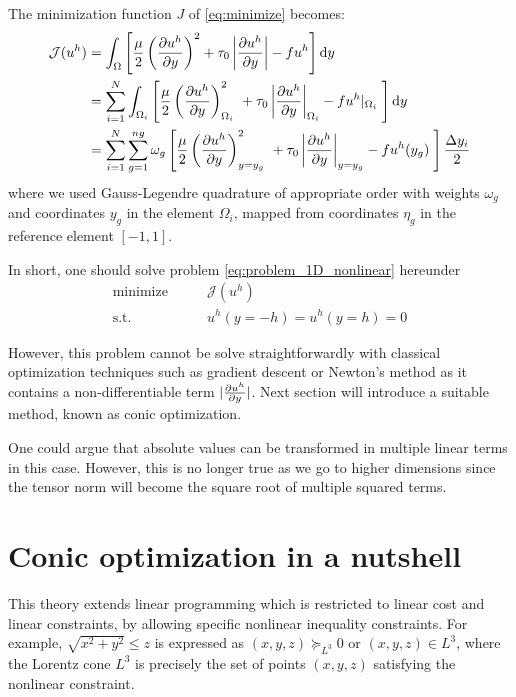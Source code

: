 \documentclass[11 pt]{report}
\begin{document}
The minimization function $J$ of \autoref{eq:minimize} becomes:
\begin{equation}
\begin{aligned}
    \mathcal{J}(u^h) &= \int_{\Omega} \left[ \frac{\mu}{2} \left(\pdv{u^h}{y}\right)^2 + \tau_0 \left|\pdv{u^h}{y}\right| - f u^h \right] \dd y\\
    &= \sum_{i=1}^N \int_{\Omega_i} \left[\frac{\mu}{2}  \left(\pdv{u^h}{y}\right)^2_{\Omega_i} \ + \tau_0 \left|\pdv{u^h}{y}\right|_{\Omega_i} - f u^h\vert_{\Omega_i} \; \right] \dd y\\
    &= \sum_{i=1}^N \sum_{g=1}^{ng} \omega_{g} \left[\frac{\mu}{2}  \left(\pdv{u^h}{y}\right)^2_{y=y_g} \ + \tau_0 \left|\pdv{u^h}{y}\right|_{y=y_g} - f u^h(y_g) \; \right] \frac{\Delta y_i}{2}
\end{aligned}
\end{equation}
where we used Gauss-Legendre quadrature of appropriate order with weights $\omega_g$ and coordinates $y_g$ in the element $\Omega_i$, mapped from coordinates $\eta_g$ in the reference element $[-1,1]$.

In short, one should solve problem \eqref{eq:problem_1D_nonlinear} hereunder
\begin{equation}
    \begin{aligned}
        \textrm{minimize} \qquad & \mathcal{J}(u^h)\\
        \textrm{s.t.} \qquad & u^h(y=-h) = u^h(y=h) = 0
    \end{aligned}\label{eq:problem_1D_nonlinear}
\end{equation}

However, this problem cannot be solve straightforwardly with classical optimization techniques such as gradient descent or Newton's method as it contains a non-differentiable term $|\pdv{u^h}{y}|$. Next section will introduce a suitable method, known as conic optimization.

One could argue that absolute values can be transformed in multiple linear terms in this case. However, this is no longer true as we go to higher dimensions since the tensor norm will become the square root of multiple squared terms. 

\section{Conic optimization in a nutshell}
This theory extends linear programming which is restricted to linear cost and linear constraints, by allowing specific nonlinear inequality constraints. For example, $\sqrt{x^2+y^2} \leq z$ is expressed as $(x,y,z) \succeq_{L^3} 0$ or $(x,y,z) \in L^3$, where the Lorentz cone $L^3$ is precisely the set of points $(x,y,z)$ satisfying the nonlinear constraint.
\end{document}
